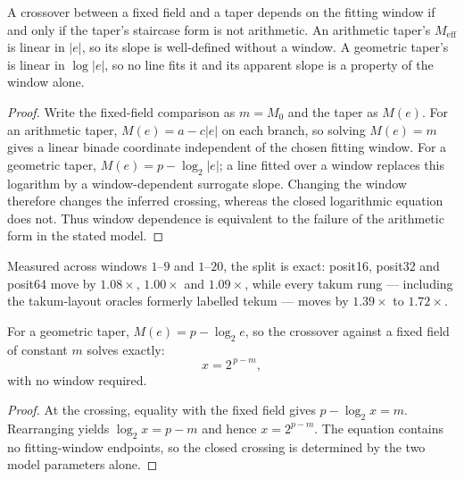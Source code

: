 \begin{theorem}
\label{thm:formwindow}
A crossover between a fixed field and a taper depends on the fitting window if
and only if the taper's staircase form is not arithmetic. An arithmetic taper's
$M_{\mathrm{eff}}$ is linear in $|e|$, so its slope is well-defined without a
window. A geometric taper's is linear in $\log|e|$, so no line fits it and its
apparent slope is a property of the window alone.
\end{theorem}
\begin{proof}
Write the fixed-field comparison as $m=M_0$ and the taper as $M(e)$.
For an arithmetic taper, $M(e)=a-c|e|$ on each branch, so solving
$M(e)=m$ gives a linear binade coordinate independent of the chosen fitting
window.  For a geometric taper, $M(e)=p-\log_2|e|$; a line fitted over
a window replaces this logarithm by a window-dependent surrogate slope.
Changing the window therefore changes the inferred crossing, whereas the
closed logarithmic equation does not.  Thus window dependence is equivalent
to the failure of the arithmetic form in the stated model.
\end{proof}

Measured across windows $1$--$9$ and $1$--$20$, the split is exact: posit16,
posit32 and posit64 move by $1.08\times$, $1.00\times$ and $1.09\times$, while
every takum rung --- including the takum-layout oracles formerly labelled
tekum --- moves by $1.39\times$ to $1.72\times$.

\begin{corollary}
\label{cor:geomcross}
For a geometric taper, $M(e) = p - \log_2 e$, so the crossover against a fixed
field of constant $m$ solves exactly:
\[
  x = 2^{\,p-m},
\]
with no window required.
\end{corollary}
\begin{proof}
At the crossing, equality with the fixed field gives
$p-\log_2 x=m$.  Rearranging yields $\log_2 x=p-m$ and hence
$x=2^{p-m}$.  The equation contains no fitting-window endpoints, so the
closed crossing is determined by the two model parameters alone.
\end{proof}

